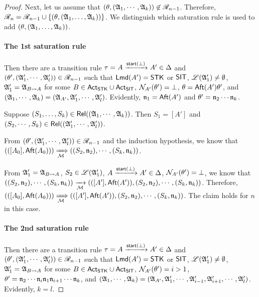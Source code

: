 \begin{proof}
Next, let us assume that $(\theta, ({\mathfrak{A} }_1, \cdots, {\mathfrak{A} }_k)) \not \in  \mathscr{R}_{n-1}$.
Therefore, $\mathscr{R}_{n} = \mathscr{R}_{n-1} \cup \{(\theta,({\mathfrak{A} }_1,\dots,{\mathfrak{A} }_k))\}$.  
%
We distinguish which saturation rule is used to add $(\theta,({\mathfrak{A} }_1,\dots,{\mathfrak{A} }_k))$.


\paragraph*{The 1st saturation rule} Then  there are a transition rule $\tau = A \xrightarrow{{\mathsf{start} }(\bot)} A'  \in \Delta$ and $(\theta', ({\mathfrak{A} }'_1, \cdots, {\mathfrak{A} }'_l)) \in \mathscr{R}_{n-1}$ such that ${\sf Lmd}(A')=\mathsf{STK}$ or ${\sf SIT}$, ${\mathscr{L} }({\mathfrak{A} }'_1) \neq \emptyset$, ${\mathfrak{A} }'_1 = {\mathfrak{A} }_{B\rightsquigarrow A}$ for some $B \in {\sf Act}_{\sf STK}\cup{\sf Act}_{\sf SIT}$, $\mathcal{N}_{A'}(\theta') = \bot$, $\theta = {\sf Aft}(A') \theta'$, and $({\mathfrak{A} }_1, \cdots, {\mathfrak{A} }_k) = ({\mathfrak{A} }_{A'}, {\mathfrak{A} }'_1, \cdots, {\mathfrak{A} }'_l)$. 
Evidently, $\mathfrak{n}_1 = {\sf Aft}(A')$ and $\theta' = \mathfrak{n}_2 \cdots \mathfrak{n}_k$. 

Suppose $(S_1,\dots,S_k) \in \mathsf{Rel}(({\mathfrak{A} }_1, \cdots, {\mathfrak{A} }_k))$. Then $S_1 = [A']$ and $(S_2, \cdots, S_k) \in \mathsf{Rel}(({\mathfrak{A} }'_1, \cdots, {\mathfrak{A} }'_l))$. 

From $(\theta', ({\mathfrak{A} }'_1, \cdots, {\mathfrak{A} }'_l)) \in \mathscr{R}_{n-1}$ and the induction hypothesis, we know that $(([A_0], {\sf Aft}(A_0))) \xRightarrow[{\mathcal{M} }]{} ((S_2, \mathfrak{n}_2), \cdots, (S_k, \mathfrak{n}_k))$. 

From ${\mathfrak{A} }'_1 = {\mathfrak{A} }_{B\rightsquigarrow A}$, $S_2 \in {\mathscr{L} }({\mathfrak{A} }'_1)$, $A \xrightarrow{{\mathsf{start} }(\bot)}A'  \in \Delta$, $\mathcal{N}_{A'}(\theta') = \bot$, we know that 
$((S_2, \mathfrak{n}_2), \cdots, (S_k, \mathfrak{n}_k)) \xrightarrow[{\mathcal{M} }]{} (([A'], {\sf Aft}(A')), (S_2, \mathfrak{n}_2), \cdots, (S_k, \mathfrak{n}_k))$.
Therefore, 
$(([A_0], {\sf Aft}(A_0))) \xRightarrow[{\mathcal{M} }]{} (([A'], {\sf Aft}(A')), (S_2, \mathfrak{n}_2), \cdots, (S_k, \mathfrak{n}_k))$. 
The claim holds for $n$ in this case. 


\paragraph*{The 2nd saturation rule} Then there are a transition rule $\tau = A \xrightarrow{{\mathsf{start} }(\bot)} A'  \in \Delta$ and $(\theta', ({\mathfrak{A} }'_1, \cdots, {\mathfrak{A} }'_l)) \in \mathscr{R}_{n-1}$ such that ${\sf Lmd}(A')=\mathsf{STK}$ or ${\sf SIT}$, ${\mathscr{L} }({\mathfrak{A} }'_1) \neq \emptyset$, ${\mathfrak{A} }'_1 = {\mathfrak{A} }_{B\rightsquigarrow A}$ for some $B \in {\sf Act}_{\sf STK} \cup {\sf Act}_{\sf SIT}$, $\mathcal{N}_{A'}(\theta') = i > 1$, 
$\theta' = \mathfrak{n}_2  \cdots  \mathfrak{n}_{i} \mathfrak{n}_1  \mathfrak{n}_{i+1}  \cdots  \mathfrak{n}_k$, and 
$({\mathfrak{A} }_1, \cdots, {\mathfrak{A} }_k) = ({\mathfrak{A} }_{A'}, {\mathfrak{A} }'_1, \cdots, {\mathfrak{A} }'_{i-1}, {\mathfrak{A} }'_{i+1}, \cdots, {\mathfrak{A} }'_l)$. Evidently, $k = l$.


\end{proof}
